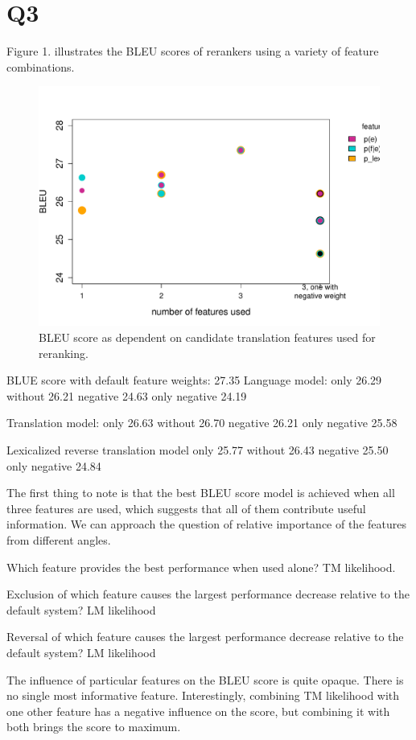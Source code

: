 \section*{Q3}
Figure 1. illustrates the BLEU scores of rerankers using a variety of feature combinations.

\begin{figure}
	\centering
	\includegraphics[scale=.65]{figures/q3.pdf}
	\caption{BLEU score as dependent on candidate translation features used for reranking.}
\end{figure}

BLUE score with default feature weights: 27.35
Language model:
	only				  26.29
	without				26.21
	negative		    24.63
	only negative	 24.19
	
Translation model:	
	only				  26.63
	without				26.70
	negative		    26.21
	only negative	 25.58	

Lexicalized reverse translation model
	only				  25.77
	without				26.43
	negative		    25.50
	only negative	 24.84

The first thing to note is that the best BLEU score model is achieved when all three features are used, which suggests that all of them contribute useful information. We can approach the question of relative importance of the features from different angles.

Which feature provides the best performance when used alone?
TM likelihood.

Exclusion of which feature causes the largest performance decrease relative to the default system?
LM likelihood

Reversal of which feature causes the largest performance decrease relative to the default system?
LM likelihood

The influence of particular features on the BLEU score is quite opaque. There is no single most informative feature. Interestingly, combining TM likelihood with one other feature has a negative influence on the score, but combining it with both brings the score to maximum.  
